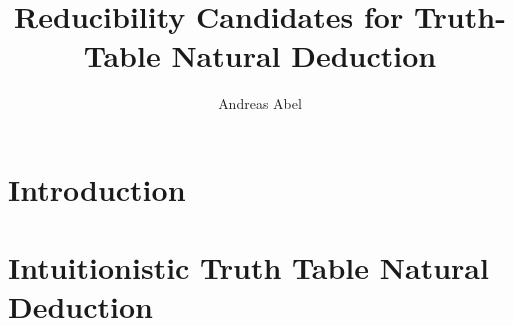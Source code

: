 \documentclass[a4paper,USenglish,cleveref, autoref, thm-restate]{lipics-v2019}
\title{Reducibility Candidates for Truth-Table Natural Deduction}
\author{Andreas Abel
  }{Department of Computer Science,
    Gothenburg University,
    Sweden
  }{andreas.abel@gu.se
  }{https://orcid.org/0000-0003-0420-4492
  }{(Optional) author-specific funding acknowledgements}
\begin{document}
\maketitle

\begin{abstract}
\end{abstract}

\section{Introduction}
\label{sec:intro}

\section{Intuitionistic Truth Table Natural Deduction}
\label{sec:nd}
\end{document}
